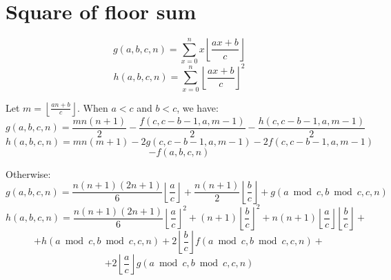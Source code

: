 \section{Square of floor sum}

$$g(a, b, c, n) = \sum_{x=0}^n x \left\lfloor\frac{ax + b}{c}\right\rfloor$$
$$h(a, b, c, n) = \sum_{x=0}^n {\left\lfloor\frac{ax + b}{c}\right\rfloor}^2$$

Let $m = \left\lfloor\frac{an + b}{c}\right\rfloor$. When $a < c$ and $b < c$, we have:
$$g(a, b, c, n) = \frac{mn(n + 1)}{2} - \frac{f(c, c - b - 1, a, m - 1)}{2} - \frac{h(c, c - b - 1, a, m - 1)}{2}$$
$$h(a, b, c, n) = mn(m + 1) - 2g(c, c - b - 1, a, m - 1) - 2f(c, c - b - 1, a, m - 1)$$$$- f(a, b, c, n)$$

Otherwise:
$$g(a, b, c, n) = \frac{n(n + 1)(2n + 1)}{6} \left\lfloor\frac{a}{c}\right\rfloor + \frac{n(n + 1)}{2} \left\lfloor\frac{b}{c}\right\rfloor + g(a \bmod c, b \bmod c, c, n)$$
$$h(a, b, c, n) = \frac{n(n + 1)(2n + 1)}{6} \left\lfloor\frac{a}{c}\right\rfloor^2 + (n + 1) \left\lfloor\frac{b}{c}\right\rfloor^2 + n(n + 1) \left\lfloor\frac{a}{c}\right\rfloor \left\lfloor\frac{b}{c}\right\rfloor +$$$$+ h(a \bmod c, b \bmod c, c, n) + 2 \left\lfloor\frac{b}{c}\right\rfloor f(a \bmod c, b \bmod c, c, n) +$$$$+ 2 \left\lfloor\frac{a}{c}\right\rfloor g(a \bmod c, b \bmod c, c, n)$$

